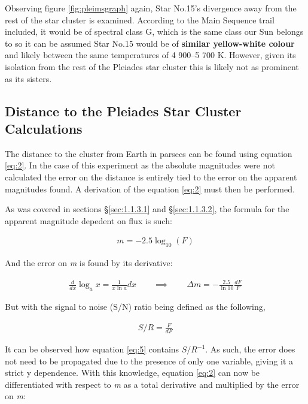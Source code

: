 \documentclass[12pt]{article}
\begin{document}
Observing figure \ref{fig:pleimsgraph} again, Star No.15's divergence away from the rest of the star cluster is examined. According to the Main Sequence trail included,
it would be of spectral class G, which is the same class our Sun belongs to so it can be assumed Star No.15 would be of \textbf{similar yellow-white colour} and likely between the same temperatures of 4 900–5 700 K. 
However, given its isolation from the rest of the Pleiades star cluster this is likely not as prominent as its sisters.

\subsection{Distance to the Pleiades Star Cluster Calculations} \label{sec:3.1}

The distance to the cluster from Earth in parsecs can be found using equation \ref{eq:2}. In the case of this experiment as the absolute magnitudes were not calculated the error on the distance is entirely tied 
to the error on the apparent magnitudes found. A derivation of the equation \ref{eq:2} must then be performed.

As was covered in sections §\ref{sec:1.1.3.1} and §\ref{sec:1.1.3.2}, the formula for the apparent magnitude depedent on flux is such:

\vspace{-1.5ex}
\begin{gather*}
    m = -2.5 \log_{10}(F)
\end{gather*}

And the error on \textit{m} is found by its derivative:

\vspace{-1.5ex}
\begin{gather} \label{eq:5}
    \frac{d}{dx} \log_ax = \frac{1}{x\ln a}dx \qquad \implies \qquad \Delta m = - \frac{2.5}{\ln 10}\frac{dF}{F}
\end{gather}

But with the signal to noise (S/N) ratio being defined as the following,

\vspace{-1.5ex}
\begin{gather*}
    S/R = \frac{F}{dF}
\end{gather*}

It can be observed how equation \ref{eq:5} contains $S/R^{-1}$. As such, the error does not need to be propagated due to the presence of only one variable, giving it a strict y dependence.
With this knowledge, equation \ref{eq:2} can now be differentiated with respect to \textit{m} as a total derivative and multiplied by the error on \textit{m}:
\end{document}
